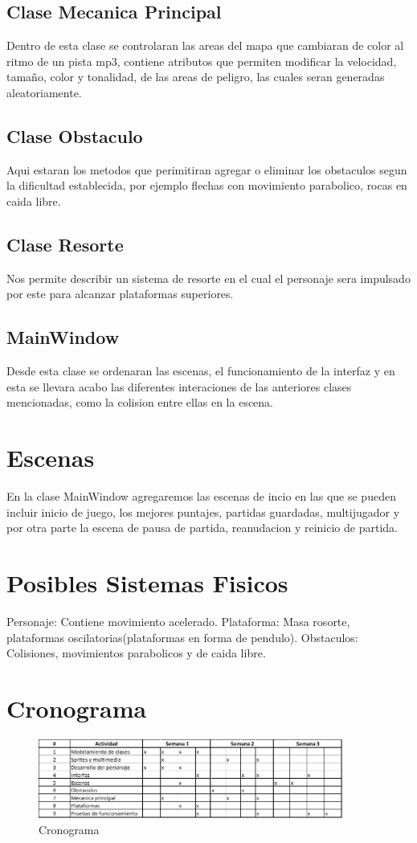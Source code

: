 \documentclass{article}
\begin{document}
\subsection{Clase Mecanica Principal}
Dentro de esta clase se controlaran las areas del mapa que cambiaran de color al ritmo de un pista mp3, contiene atributos que permiten modificar la velocidad, tamaño, color y tonalidad, de las areas de peligro, las cuales seran generadas aleatoriamente.
\subsection{Clase Obstaculo}
Aqui estaran los metodos que perimitiran agregar o eliminar los obstaculos segun la dificultad establecida, por ejemplo flechas con movimiento parabolico, rocas en caida libre.
\subsection{Clase Resorte}
Nos permite describir un sistema de resorte en el cual el personaje sera impulsado por este para alcanzar plataformas superiores.
\subsection{MainWindow}
Desde esta clase se ordenaran las escenas, el funcionamiento de la interfaz y en esta se llevara acabo las diferentes interaciones de las anteriores clases mencionadas, como la colision entre ellas en la escena.

\section{Escenas}
En la clase MainWindow agregaremos las escenas de incio en las que se pueden incluir inicio de juego, los mejores puntajes, partidas guardadas, multijugador y por otra parte la escena de pausa de partida, reanudacion y reinicio de partida.

 \section{Posibles Sistemas Fisicos}
 Personaje: Contiene movimiento acelerado.
 Plataforma: Masa rosorte, plataformas oscilatorias(plataformas en forma de pendulo).
 Obstaculos: Colisiones, movimientos parabolicos y de caida libre.
 

\section{Cronograma}
    \begin{figure}[h]
    \includegraphics[width=10cm]{cronog.png}
    \centering
    \caption{Cronograma}
    \label{fig:Cronograma}
    \end{figure}
 
\end{document}
